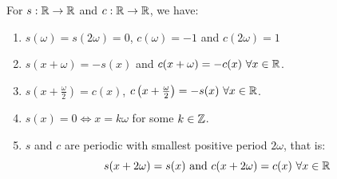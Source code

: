 \documentclass[../main.tex]{subfiles}
\begin{document}
\begin{corollary}
  For $s: \mathbb{R} \to \mathbb{R}$ and $c: \mathbb{R} \to \mathbb{R}$, we have: \label{trigPeriodicIdentities}
  \begin{enumerate}
    \item $s(\omega) = s(2\omega) = 0$, $c(\omega) = -1$ and $c(2\omega) = 1$
    \item $s(x + \omega) = -s(x)$ and $c(x + \omega) = -c(x)\ \forall x \in \mathbb{R}$.
    \item $s\left(x + \frac{\omega}{2}\right) = c(x)$, $c\left(x + \frac{\omega}{2}\right) = -s(x)\ \forall x \in \R$.
    \item $s(x) = 0 \iff x = k\omega$ for some $k \in \mathbb{Z}$.
    \item $s$ and $c$ are periodic with smallest positive period $2\omega$, that is:
      \[
        s(x + 2\omega) = s(x) \text{ and } c(x + 2\omega) = c(x)\ \forall x \in \mathbb{R}
      \]
  \end{enumerate}
\end{corollary}
\end{document}
